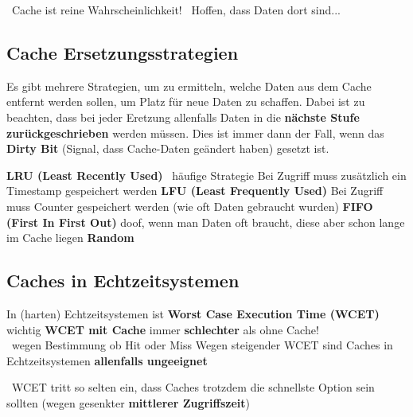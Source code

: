 \vspace{0.1cm}

\textrightarrow\ Cache ist reine Wahrscheinlichkeit! \textrightarrow\ Hoffen, dass Daten dort sind...


\subsection{Cache Ersetzungsstrategien}

Es gibt mehrere Strategien, um zu ermitteln, welche Daten aus dem Cache entfernt werden sollen, um Platz für neue Daten zu schaffen.
Dabei ist zu beachten, dass bei jeder Eretzung allenfalls Daten in die \textbf{nächste Stufe zurückgeschrieben} werden müssen.
Dies ist immer dann der Fall, wenn das \textbf{Dirty Bit} (Signal, dass Cache-Daten geändert haben) gesetzt ist.

\vspace{0.1cm}

\begin{outline}
    \1 \textbf{LRU (Least Recently Used)} \textrightarrow\ häufige Strategie
        \2 Bei Zugriff muss zusätzlich ein Timestamp gespeichert werden
    \1 \textbf{LFU (Least Frequently Used)}
        \2 Bei Zugriff muss Counter gespeichert werden (wie oft Daten gebraucht wurden)
    \1 \textbf{FIFO (First In First Out)}
        \2 doof, wenn man Daten oft braucht, diese aber schon lange im Cache liegen
    \1 \textbf{Random}
\end{outline}


\subsection{Caches in Echtzeitsystemen}

\begin{outline}
    \1 In (harten) Echtzeitsystemen ist \textbf{Worst Case Execution Time (WCET)} wichtig
        \2 \textbf{WCET mit Cache} immer \textbf{schlechter} als ohne Cache!\\
        \textrightarrow\ wegen Bestimmung ob Hit oder Miss
    \1 Wegen steigender WCET sind Caches in Echtzeitsystemen \textbf{allenfalls ungeeignet}
\end{outline}

\vspace{0.1cm}

\textrightarrow\ WCET tritt so selten ein, dass Caches trotzdem die schnellste Option sein sollten (wegen gesenkter \textbf{mittlerer Zugriffszeit})


